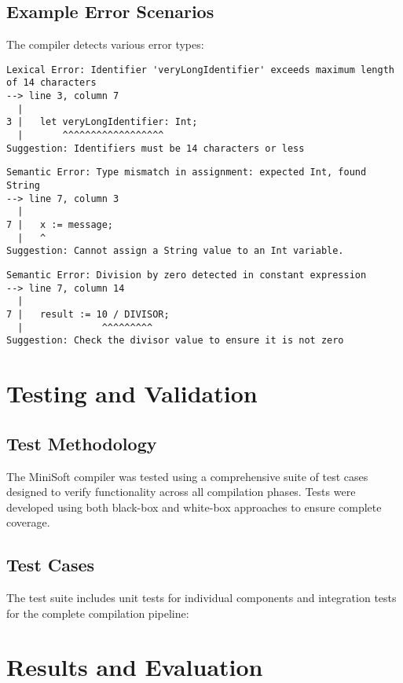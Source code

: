 \documentclass[12pt,a4paper]{article}
\begin{document}
\subsection{Example Error Scenarios}
The compiler detects various error types:

\begin{lstlisting}[caption={Lexical Error Example}]
Lexical Error: Identifier 'veryLongIdentifier' exceeds maximum length of 14 characters
--> line 3, column 7
  |
3 |   let veryLongIdentifier: Int;
  |       ^^^^^^^^^^^^^^^^^^
Suggestion: Identifiers must be 14 characters or less
\end{lstlisting}

\begin{lstlisting}[caption={Semantic Error Example}]
Semantic Error: Type mismatch in assignment: expected Int, found String
--> line 7, column 3
  |
7 |   x := message;
  |   ^
Suggestion: Cannot assign a String value to an Int variable.
\end{lstlisting}

\begin{lstlisting}[caption={Compile-Time Error Example}]
Semantic Error: Division by zero detected in constant expression
--> line 7, column 14
  |
7 |   result := 10 / DIVISOR;
  |              ^^^^^^^^^
Suggestion: Check the divisor value to ensure it is not zero
\end{lstlisting}

\section{Testing and Validation}
\subsection{Test Methodology}
The MiniSoft compiler was tested using a comprehensive suite of test cases designed to verify functionality across all compilation phases. Tests were developed using both black-box and white-box approaches to ensure complete coverage.
\subsection{Test Cases}
The test suite includes unit tests for individual components and integration tests for the complete compilation pipeline:

\section{Results and Evaluation}
\end{document}
